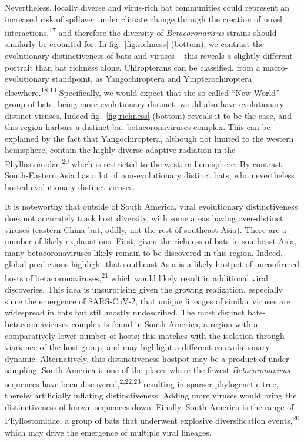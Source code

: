 \documentclass[10pt,oneside]{article}
\begin{document}
Nevertheless, locally diverse and virus-rich bat communities could
represent an increased risk of spillover under climate change through
the creation of novel interactions,\textsuperscript{17} and therefore
the diversity of \emph{Betacoronavirus} strains should similarly be
ccounted for. In fig.~\ref{fig:richness} (bottom), we contrast the
evolutionary distinctiveness of bats and viruses -- this reveals a
slightly different portrait than bat richness alone. Chiropterans can be
classified, from a macro-evolutionary standpoint, as Yangochiroptera and
Yinpterochiroptera elsewhere.\textsuperscript{18,19} Specifically, we
would expect that the so-called ``New World'' group of bats, being more
evolutionary distinct, would also have evolutionary distinct viruses.
Indeed fig.~\ref{fig:richness} (bottom) reveals it to be the case, and
this region harbors a distinct bat-betacoronaviruses complex. This can
be explained by the fact that Yangochiroptera, although not limited to
the western hemisphere, contain the highly diverse adaptive radiation in
the Phyllostomidae,\textsuperscript{20} which is restricted to the
western hemisphere. By contrast, South-Eastern Asia has a lot of
non-evolutionary distinct bats, who nevertheless hosted
evolutionary-distinct viruses.

It is noteworthy that outside of South America, viral evolutionary
distinctiveness does not accurately track host diversity, with some
areas having over-distinct viruses (eastern China but, oddly, not the
rest of southeast Asia). There are a number of likely explanations.
First, given the richness of bats in southeast Asia, many
betacoronaviruses likely remain to be discovered in this region. Indeed,
global predictions highlight that southeast Asia is a likely hostpot of
unconfirmed hosts of betacoronaviruses,\textsuperscript{21} which would
likely result in additional viral discoveries. This idea is unsurprising
given the growing realization, especially since the emergence of
SARS-CoV-2, that unique lineages of similar viruses are widespread in
bats but still mostly undescribed. The most distinct
bats-betacoronaviruses complex is found in South America, a region with
a comparatively lower number of hosts; this matches with the isolation
through viariance of the host group, and may highlight a different
co-evolutionary dynamic. Alternatively, this distinctiveness hostpot may
be a product of under-sampling: South-America is one of the places where
the fewest \emph{Betacoronavirus} sequences have been
discovered,\textsuperscript{2,22,23} resulting in sparser phylogenetic
tree, thereby artificially inflating distinctiveness. Adding more
viruses would bring the distinctiveness of known sequences down.
Finally, South-America is the range of Phyllostomidae, a group of bats
that underwent explosive diversification events,\textsuperscript{20}
which may drive the emergence of multiple viral lineages.
\end{document}

